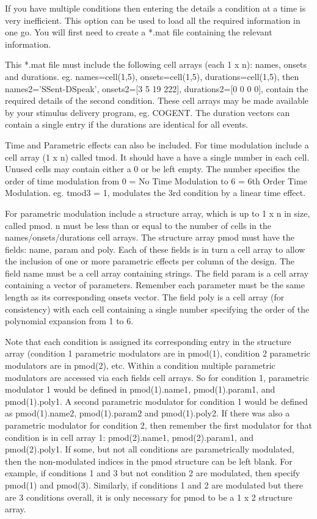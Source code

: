 If you have multiple conditions then entering the details a condition at a time is very inefficient. This option can be used to load all the required information in one go. You will first need to create a *.mat file containing the relevant information. 



This *.mat file must include the following cell arrays (each 1 x n): names, onsets and durations. eg. names=cell(1,5), onsets=cell(1,5), durations=cell(1,5), then names{2}='SSent-DSpeak', onsets{2}=[3 5 19 222], durations{2}=[0 0 0 0], contain the required details of the second condition. These cell arrays may be made available by your stimulus delivery program, eg. COGENT. The duration vectors can contain a single entry if the durations are identical for all events.



Time and Parametric effects can also be included. For time modulation include a cell array (1 x n) called tmod. It should have a have a single number in each cell. Unused cells may contain either a 0 or be left empty. The number specifies the order of time modulation from 0 = No Time Modulation to 6 = 6th Order Time Modulation. eg. tmod{3} = 1, modulates the 3rd condition by a linear time effect.



For parametric modulation include a structure array, which is up to 1 x n in size, called pmod. n must be less than or equal to the number of cells in the names/onsets/durations cell arrays. The structure array pmod must have the fields: name, param and poly.  Each of these fields is in turn a cell array to allow the inclusion of one or more parametric effects per column of the design. The field name must be a cell array containing strings. The field param is a cell array containing a vector of parameters. Remember each parameter must be the same length as its corresponding onsets vector. The field poly is a cell array (for consistency) with each cell containing a single number specifying the order of the polynomial expansion from 1 to 6.



Note that each condition is assigned its corresponding entry in the structure array (condition 1 parametric modulators are in pmod(1), condition 2 parametric modulators are in pmod(2), etc. Within a condition multiple parametric modulators are accessed via each fields cell arrays. So for condition 1, parametric modulator 1 would be defined in  pmod(1).name{1}, pmod(1).param{1}, and pmod(1).poly{1}. A second parametric modulator for condition 1 would be defined as pmod(1).name{2}, pmod(1).param{2} and pmod(1).poly{2}. If there was also a parametric modulator for condition 2, then remember the first modulator for that condition is in cell array 1: pmod(2).name{1}, pmod(2).param{1}, and pmod(2).poly{1}. If some, but not all conditions are parametrically modulated, then the non-modulated indices in the pmod structure can be left blank. For example, if conditions 1 and 3 but not condition 2 are modulated, then specify pmod(1) and pmod(3). Similarly, if conditions 1 and 2 are modulated but there are 3 conditions overall, it is only necessary for pmod to be a 1 x 2 structure array.



